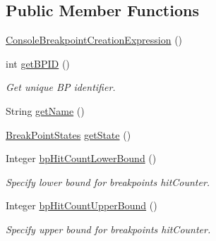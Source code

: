 \subsection*{Public Member Functions}
\begin{DoxyCompactItemize}
\item 
\hyperlink{classgov_1_1nasa_1_1jpf_1_1inspector_1_1client_1_1commands_1_1_cmd_breakpoint_create_1_1_console_breakpoint_creation_expression_a679b3730890e9cd71948699c4a807e33}{Console\+Breakpoint\+Creation\+Expression} ()
\item 
int \hyperlink{classgov_1_1nasa_1_1jpf_1_1inspector_1_1client_1_1commands_1_1_cmd_breakpoint_create_1_1_console_breakpoint_creation_expression_aabe1aec7aaebc064aa33ff0cb2e8d69c}{get\+B\+P\+ID} ()
\begin{DoxyCompactList}\small\item\em Get unique BP identifier. \end{DoxyCompactList}\item 
String \hyperlink{classgov_1_1nasa_1_1jpf_1_1inspector_1_1client_1_1commands_1_1_cmd_breakpoint_create_1_1_console_breakpoint_creation_expression_aea9526b3c8cdf0d785f137401ab8c4fb}{get\+Name} ()
\item 
\hyperlink{enumgov_1_1nasa_1_1jpf_1_1inspector_1_1interfaces_1_1_break_point_states}{Break\+Point\+States} \hyperlink{classgov_1_1nasa_1_1jpf_1_1inspector_1_1client_1_1commands_1_1_cmd_breakpoint_create_1_1_console_breakpoint_creation_expression_a1dba274145a2220c1f5d4a45848376b7}{get\+State} ()
\item 
Integer \hyperlink{classgov_1_1nasa_1_1jpf_1_1inspector_1_1client_1_1commands_1_1_cmd_breakpoint_create_1_1_console_breakpoint_creation_expression_a68cde0ed3713a01d28bf3c315fb6b2ba}{bp\+Hit\+Count\+Lower\+Bound} ()
\begin{DoxyCompactList}\small\item\em Specify lower bound for breakpoint\textquotesingle{}s hit\+Counter. \end{DoxyCompactList}\item 
Integer \hyperlink{classgov_1_1nasa_1_1jpf_1_1inspector_1_1client_1_1commands_1_1_cmd_breakpoint_create_1_1_console_breakpoint_creation_expression_af770a487681d0531b3bf07d17c7f2387}{bp\+Hit\+Count\+Upper\+Bound} ()
\begin{DoxyCompactList}\small\item\em Specify upper bound for breakpoint\textquotesingle{}s hit\+Counter. \end{DoxyCompactList}\item 

\end{DoxyCompactItemize}
